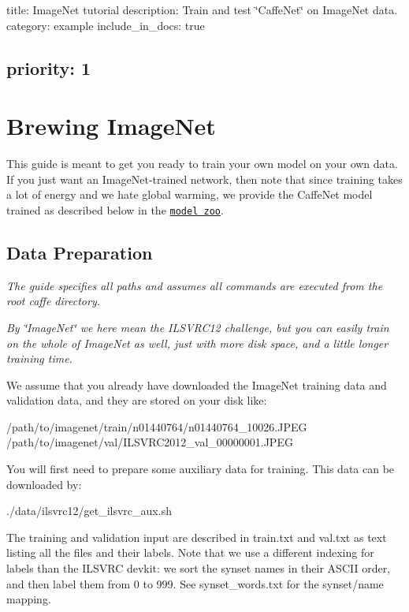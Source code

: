 

 title\+: Image\+Net tutorial description\+: Train and test \char`\"{}\+Caffe\+Net\char`\"{} on Image\+Net data. category\+: example include\+\_\+in\+\_\+docs\+: true \subsection*{priority\+: 1 }

\section*{Brewing Image\+Net }

This guide is meant to get you ready to train your own model on your own data. If you just want an Image\+Net-\/trained network, then note that since training takes a lot of energy and we hate global warming, we provide the Caffe\+Net model trained as described below in the \href{/model_zoo.html}{\tt model zoo}.

\subsection*{Data Preparation }

{\itshape The guide specifies all paths and assumes all commands are executed from the root caffe directory.}

{\itshape By \char`\"{}\+Image\+Net\char`\"{} we here mean the I\+L\+S\+V\+R\+C12 challenge, but you can easily train on the whole of Image\+Net as well, just with more disk space, and a little longer training time.}

We assume that you already have downloaded the Image\+Net training data and validation data, and they are stored on your disk like\+: \begin{DoxyVerb}/path/to/imagenet/train/n01440764/n01440764_10026.JPEG
/path/to/imagenet/val/ILSVRC2012_val_00000001.JPEG
\end{DoxyVerb}


You will first need to prepare some auxiliary data for training. This data can be downloaded by\+: \begin{DoxyVerb}./data/ilsvrc12/get_ilsvrc_aux.sh
\end{DoxyVerb}


The training and validation input are described in {\ttfamily train.\+txt} and {\ttfamily val.\+txt} as text listing all the files and their labels. Note that we use a different indexing for labels than the I\+L\+S\+V\+RC devkit\+: we sort the synset names in their A\+S\+C\+II order, and then label them from 0 to 999. See {\ttfamily synset\+\_\+words.\+txt} for the synset/name mapping.

